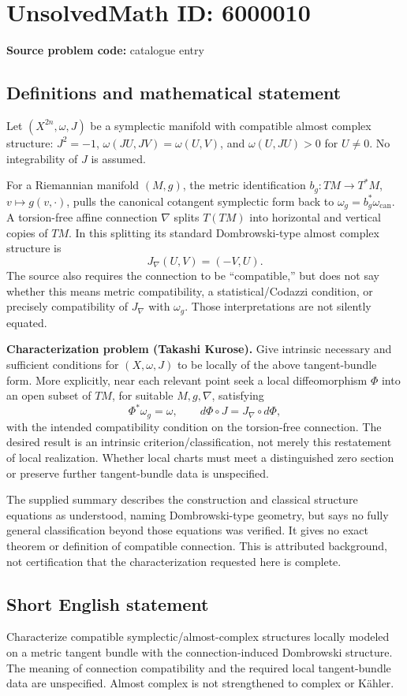 \documentclass[11pt]{article}
\begin{document}
\section*{UnsolvedMath ID: 6000010}
\textbf{Source problem code:} catalogue entry
\subsection{Definitions and mathematical statement}
Let $(X^{2n},\omega,J)$ be a symplectic manifold with compatible almost complex structure: $J^2=-1$, $\omega(JU,JV)=\omega(U,V)$, and $\omega(U,JU)>0$ for $U\ne0$. No integrability of $J$ is assumed.

For a Riemannian manifold $(M,g)$, the metric identification $b_g:TM\to T^*M$, $v\mapsto g(v,\cdot)$, pulls the canonical cotangent symplectic form back to $\omega_g=b_g^*\omega_{\mathrm{can}}$. A torsion-free affine connection $\nabla$ splits $T(TM)$ into horizontal and vertical copies of $TM$. In this splitting its standard Dombrowski-type almost complex structure is
\[
 J_\nabla(U,V)=(-V,U).
\]
The source also requires the connection to be ``compatible,'' but does not say whether this means metric compatibility, a statistical/Codazzi condition, or precisely compatibility of $J_\nabla$ with $\omega_g$. Those interpretations are not silently equated.

\textbf{Characterization problem (Takashi Kurose).} Give intrinsic necessary and sufficient conditions for $(X,\omega,J)$ to be locally of the above tangent-bundle form. More explicitly, near each relevant point seek a local diffeomorphism $\Phi$ into an open subset of $TM$, for suitable $M,g,\nabla$, satisfying
\[
 \Phi^*\omega_g=\omega,\qquad
 d\Phi\circ J=J_\nabla\circ d\Phi,
\]
with the intended compatibility condition on the torsion-free connection. The desired result is an intrinsic criterion/classification, not merely this restatement of local realization. Whether local charts must meet a distinguished zero section or preserve further tangent-bundle data is unspecified.

The supplied summary describes the construction and classical structure equations as understood, naming Dombrowski-type geometry, but says no fully general classification beyond those equations was verified. It gives no exact theorem or definition of compatible connection. This is attributed background, not certification that the characterization requested here is complete.
\subsection{Short English statement}
Characterize compatible symplectic/almost-complex structures locally modeled on a metric tangent bundle with the connection-induced Dombrowski structure. The meaning of connection compatibility and the required local tangent-bundle data are unspecified. Almost complex is not strengthened to complex or Kähler.
\end{document}
